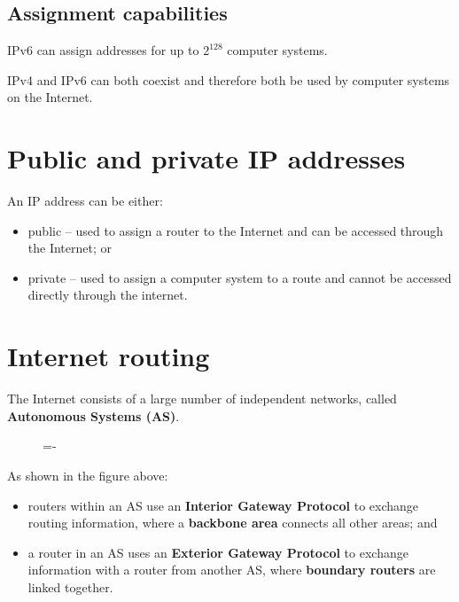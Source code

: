 \documentclass[a4paper]{systems-software}
\begin{document}
\subsection*{Assignment capabilities}

IPv6 can assign addresses for up to $2^{128}$ computer systems.

IPv4 and IPv6 can both coexist and therefore both be used by computer systems on the Internet.


\newpage

\section*{Public and private IP addresses}

An IP address can be either:
\begin{itemize}
	\item public -- used to assign a router to the Internet and can be accessed through the Internet; or
	\item private -- used to assign a computer system to a route and cannot be accessed directly through the internet.
\end{itemize}


\section{Internet routing}

The Internet consists of a large number of independent networks, called \textbf{Autonomous Systems (AS)}.

\begin{figure}[H]
	\lineskip=-\fboxrule
\end{figure}

As shown in the figure above:
\begin{itemize}
	\item routers within an AS use an \textbf{Interior Gateway Protocol} to exchange routing information, where a \textbf{backbone area} connects all other areas; and
	\item a router in an AS uses an \textbf{Exterior Gateway Protocol} to exchange information with a router from another AS, where \textbf{boundary routers} are linked together.
\end{itemize}
\end{document}

